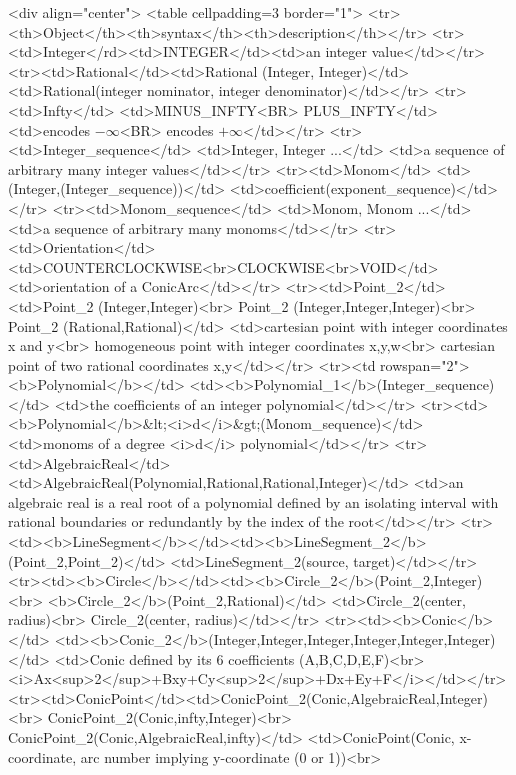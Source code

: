 \begin{ccHtmlOnly}
<div align="center">
<table cellpadding=3 border="1">
<tr><th>Object</th><th>syntax</th><th>description</th></tr>
<tr><td>Integer</rd><td>INTEGER</td><td>an integer value</td></tr>
<tr><td>Rational</td><td>Rational (Integer, Integer)</td>
  <td>Rational(integer nominator, integer denominator)</td></tr>
<tr><td>Infty</td>
    <td>MINUS_INFTY<BR>
        PLUS_INFTY</td>
    <td>encodes $-\infty$<BR>
        encodes $+\infty$</td></tr>
<tr><td>Integer_sequence</td>
    <td>Integer, Integer ...</td>
    <td>a sequence of arbitrary many integer values</td></tr>
<tr><td>Monom</td>
    <td>(Integer,(Integer_sequence))</td>
    <td>coefficient(exponent_sequence)</td></tr>
<tr><td>Monom_sequence</td>
    <td>Monom, Monom ...</td>
    <td>a sequence of arbitrary many monoms</td></tr>
<tr><td>Orientation</td><td>COUNTERCLOCKWISE<br>CLOCKWISE<br>VOID</td><td>orientation of a ConicArc</td></tr>
<tr><td>Point_2</td>
  <td>Point_2 (Integer,Integer)<br>
      Point_2 (Integer,Integer,Integer)<br>
      Point_2 (Rational,Rational)</td>
  <td>cartesian point with integer coordinates x and y<br>
      homogeneous point with integer coordinates x,y,w<br>
      cartesian point of two rational coordinates x,y</td></tr>
<tr><td rowspan="2"><b>Polynomial</b></td>
    <td><b>Polynomial_1</b>(Integer_sequence)</td>
    <td>the coefficients of an integer polynomial</td></tr>
<tr><td><b>Polynomial</b>&lt;<i>d</i>&gt;(Monom_sequence)</td>
    <td>monoms of a degree <i>d</i> polynomial</td></tr>
<tr><td>AlgebraicReal</td>
    <td>AlgebraicReal(Polynomial,Rational,Rational,Integer)</td>
    <td>an algebraic real is a real root of a polynomial defined by an
        isolating interval with rational boundaries or redundantly by
	the index of the root</td></tr>
<tr><td><b>LineSegment</b></td><td><b>LineSegment_2</b>(Point_2,Point_2)</td>
  <td>LineSegment_2(source, target)</td></tr>
<tr><td><b>Circle</b></td><td><b>Circle_2</b>(Point_2,Integer)<br>
                              <b>Circle_2</b>(Point_2,Rational)</td>
  <td>Circle_2(center, radius)<br>
      Circle_2(center, radius)</td></tr>
<tr><td><b>Conic</b></td>
  <td><b>Conic_2</b>(Integer,Integer,Integer,Integer,Integer,Integer)</td>
  <td>Conic defined by its 6 coefficients (A,B,C,D,E,F)<br>
      <i>Ax<sup>2</sup>+Bxy+Cy<sup>2</sup>+Dx+Ey+F</i></td></tr>
<tr><td>ConicPoint</td><td>ConicPoint_2(Conic,AlgebraicReal,Integer)<br>
                           ConicPoint_2(Conic,infty,Integer)<br>
			   ConicPoint_2(Conic,AlgebraicReal,infty)</td>
                       <td>ConicPoint(Conic, x-coordinate, arc number implying y-coordinate (0 or 1))<br>

\end{ccHtmlOnly}
